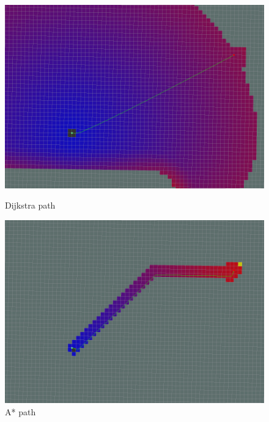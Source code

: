 \documentclass[12pt]{article}
\begin{document}
\begin{figure}[!htb]
  \includegraphics[width=\linewidth]{Dijkstra.png}
  \caption{Dijkstra path}
\endminipage\hfill
{}
  \includegraphics[width=\linewidth]{AStar2.png}
  \caption{A* path}
\endminipage\hfill
\end{figure}
\end{document}

